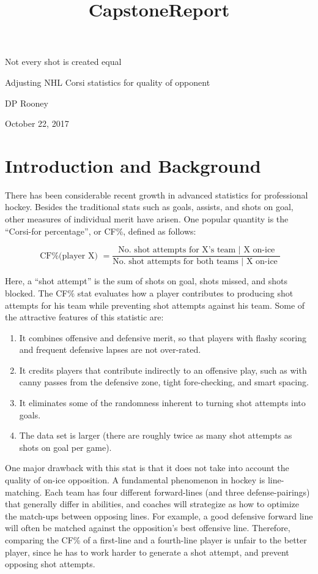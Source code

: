 \documentclass[11pt]{article}
\title{CapstoneReport}
\providecommand{\tightlist}{%
      \setlength{\itemsep}{0pt}\setlength{\parskip}{0pt}}
\begin{document}
    
    
    \maketitle
    
    

    
    Not every shot is created equal

Adjusting NHL Corsi statistics for quality of opponent

DP Rooney

October 22, 2017

    \section{Introduction and
Background}\label{introduction-and-background}

There has been considerable recent growth in advanced statistics for
professional hockey. Besides the traditional stats such as goals,
assists, and shots on goal, other measures of individual merit have
arisen. One popular quantity is the ``Corsi-for percentage'', or CF\%,
defined as follows:

\[\textrm{ CF\%(player X) } = \frac{\textrm{No. shot attempts for X's team | X on-ice}}{\textrm{No. shot attempts for both teams | X on-ice }} \]

Here, a ``shot attempt'' is the sum of shots on goal, shots missed, and
shots blocked. The CF$\%$ stat evaluates how a player contributes to
producing shot attempts for his team while preventing shot attempts
against his team. Some of the attractive features of this statistic are:

\begin{enumerate}
\def\labelenumi{\arabic{enumi}.}
\tightlist
\item
  It combines offensive and defensive merit, so that players with flashy
  scoring and frequent defensive lapses are not over-rated.
\item
  It credits players that contribute indirectly to an offensive play,
  such as with canny passes from the defensive zone, tight
  fore-checking, and smart spacing.
\item
  It eliminates some of the randomness inherent to turning shot attempts
  into goals.
\item
  The data set is larger (there are roughly twice as many shot attempts
  as shots on goal per game).
\end{enumerate}

One major drawback with this stat is that it does not take into account
the quality of on-ice opposition. A fundamental phenomenon in hockey is
line-matching. Each team has four different forward-lines (and three
defense-pairings) that generally differ in abilities, and coaches will
strategize as how to optimize the match-ups between opposing lines. For
example, a good defensive forward line will often be matched against the
opposition's best offensive line. Therefore, comparing the CF\% of a
first-line and a fourth-line player is unfair to the better player,
since he has to work harder to generate a shot attempt, and prevent
opposing shot attempts.
\end{document}
